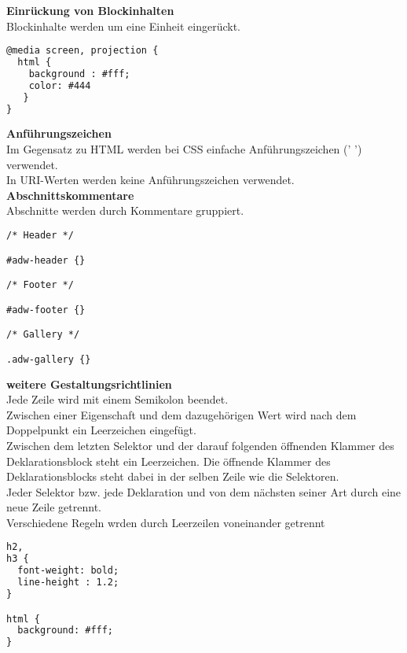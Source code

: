 \textbf{Einrückung von Blockinhalten}\\
Blockinhalte werden um eine Einheit eingerückt.
\begin{lstlisting}[language = HTML, caption = Einrückung von Blockinhalten, label = block indent]
@media screen, projection {
  html {
    background : #fff;
    color: #444
   }
}		
\end{lstlisting}

\textbf{Anführungszeichen}\\
Im Gegensatz zu HTML werden bei CSS einfache Anführungszeichen (' ') verwendet.\\
In URI-Werten werden keine Anführungszeichen verwendet.\\

\textbf{Abschnittskommentare}\\
Abschnitte werden durch Kommentare gruppiert.
\begin{lstlisting}[language = HTML, caption = Einteilung einer CSS-Datei durch Abschnittskommentare, label = sec comments]
/* Header */

#adw-header {}

/* Footer */

#adw-footer {}

/* Gallery */

.adw-gallery {}
\end{lstlisting}

\textbf{weitere Gestaltungsrichtlinien}\\
Jede Zeile wird mit einem Semikolon beendet.\\
Zwischen einer Eigenschaft und dem dazugehörigen Wert wird nach dem Doppelpunkt ein Leerzeichen eingefügt.\\
Zwischen dem letzten Selektor und der darauf folgenden öffnenden Klammer des Deklarationsblock steht ein Leerzeichen. Die öffnende Klammer des Deklarationsblocks steht dabei in der selben Zeile wie die Selektoren.\\
Jeder Selektor bzw. jede Deklaration und von dem nächsten seiner Art durch eine neue Zeile getrennt. \\
Verschiedene Regeln wrden durch Leerzeilen voneinander getrennt
\begin{lstlisting}[language = HTML, caption = Beispiel für die weiteren Gestaltungsrichtlinien, label = guidelines]
h2,
h3 {
  font-weight: bold;
  line-height : 1.2;
}

html {
  background: #fff;
}
\end{lstlisting}













